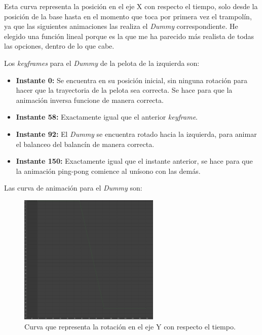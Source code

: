 Esta curva representa la posición en el eje X con respecto el tiempo, solo desde la posición de la base hasta en el momento que toca por primera vez el trampolín, ya que las siguientes animaciones las realiza el \textit{Dummy} correspondiente. He elegido una función lineal porque es la que me ha parecido más realista de todas las opciones, dentro de lo que cabe.

\bigskip

Los \textit{keyframes} para el \textit{Dummy} de la pelota de la izquierda son:

\begin{itemize}
    \item \textbf{Instante 0: }Se encuentra en su posición inicial, sin ninguna rotación para hacer que la trayectoria de la pelota sea correcta. Se hace para que la animación inversa funcione de manera correcta.
    \item \textbf{Instante 58: }Exactamente igual que el anterior \textit{keyframe}.
    \item \textbf{Instante 92: }El \textit{Dummy} se encuentra rotado hacia la izquierda, para animar el balanceo del balancín de manera correcta.
    \item \textbf{Instante 150: }Exactamente igual que el instante anterior, se hace para que la animación ping-pong comience al unísono con las demás.
\end{itemize}

\newpage

Las curva de animación para el \textit{Dummy} son:

\begin{figure}[H]
    \centering
    \includegraphics[width=0.6\textwidth]{imagenes/curvas/PL/dummy/green.png}
    \caption{Curva que representa la rotación en el eje Y con respecto el tiempo.}
\end{figure}

